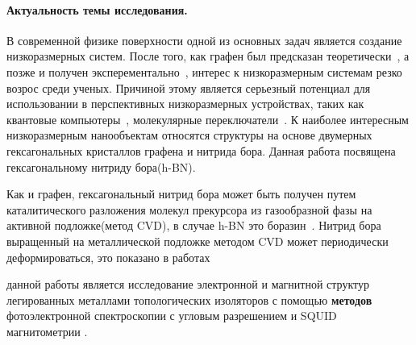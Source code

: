 
{\actuality} 
\paragraph{Актуальность темы исследования.}
В современной физике поверхности одной из основных задач является
создание низкоразмерных систем. После того, как графен был предсказан
теоретически~\cite{Wallace1947,McClure1956,Slonczewski1958}, а позже и получен эксперементально~\cite{Novoselov2004}, интерес к 
низкоразмерным системам резко возрос среди ученых. Причиной этому является
серьезный потенциал для использовании в перспективных низкоразмерных 
устройствах, таких как квантовые компьютеры~\cite{Barends2014}, молекулярные переключатели~\cite{G.Joachim2000,Nitzan2003}. 
К наиболее интересным низкоразмерным нанообъектам относятся структуры на 
основе двумерных гексагональных кристаллов графена и нитрида бора.
Данная работа посвящена гексагональному нитриду бора(h-BN). 


Как и графен, гексагональный нитрид бора может быть получен путем каталитического разложения молекул прекурсора из газообразной 
фазы на активной подложке(метод CVD), в случае h-BN это
боразин~\cite{Kidambi2014,Paffett1990}. Нитрид бора выращенный на
металлической подложке методом CVD может периодически деформироваться, это показано в работах~\cite{Preobrajenski2008_Adsorption-inducedgapstatesofh-BNonmetalsurfaces,Brugger2009,Nagashima1995,Weng2016}


{\aim} данной работы является исследование электронной и магнитной структур легированных металлами топологических изоляторов с помощью \textbf{методов} фотоэлектронной спектроскопии с угловым разрешением и SQUID магнитометрии . 



